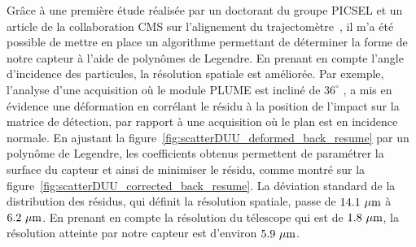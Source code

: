   Grâce à une première étude réalisée par un doctorant du groupe PICSEL et un article de la collaboration CMS sur l'alignement du trajectomètre~\cite{CMSalignment}, il m'a été possible de mettre en place un algorithme permettant de déterminer la forme de notre capteur à l'aide de polynômes de Legendre. 
  En prenant en compte l'angle d'incidence des particules, la résolution spatiale est améliorée. 
  Par exemple, l'analyse d'une acquisition où le module PLUME est incliné de $36^{\circ}$ , a mis en évidence une déformation en corrélant le résidu à la position de l'impact sur la matrice de détection, par rapport à une acquisition où le plan est en incidence normale.
  En ajustant la figure~\ref{fig:scatterDUU_deformed_back_resume} par un polynôme de Legendre, les coefficients obtenus permettent de paramétrer la surface du capteur et ainsi de minimiser le résidu, comme montré sur la figure~\ref{fig:scatterDUU_corrected_back_resume}. 
  La déviation standard de la distribution des résidus, qui définit la résolution spatiale, passe de $14.1~\mu\rm{m}$ à $6.2~\mu\rm{m}$.
  En prenant en compte la résolution du télescope qui est de $1.8~\mu\rm{m}$, la résolution atteinte par notre capteur est d'environ $5.9~\mu\rm{m}$. 

